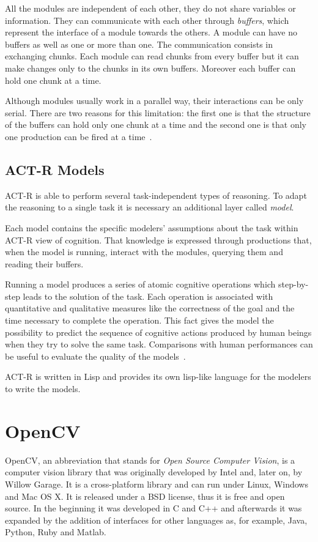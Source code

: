 	
		All the modules are independent of each other, they do not share variables or information. They can communicate with each other through \emph{buffers}, which represent the interface of a module towards the others. A module can have no buffers as well as one or more than one. The communication consists in exchanging chunks. Each module can read chunks from every buffer but it can make changes only to the chunks in its own buffers. Moreover each buffer can hold one chunk at a time. 

		Although modules usually work in a parallel way, their interactions can be only serial.
		There are two reasons for this limitation: the first one is that the structure of the buffers can hold only one chunk at a time and the second one is that only one production can be fired at a time~\cite{actr6refman}.
	
	\subsection{ACT-R Models}\label{modelSect}
	ACT-R is able to perform several task-independent types of reasoning. 
	To adapt the reasoning to a single task it is necessary an additional layer called \emph{model}.

	Each model contains the specific modelers' assumptions about the task within ACT-R view of cognition. That knowledge is expressed through productions that, when the model is running, interact with the modules, querying them and reading their buffers. 
	
	Running a model produces a series of atomic cognitive operations which step-by-step leads to the solution of the task. Each operation is associated with quantitative and qualitative measures like the correctness of the goal and the time necessary to complete the operation.
	This fact gives the model the possibility to predict the sequence of cognitive actions produced by human beings when they try to solve the same task.
	Comparisons with human performances can be useful to evaluate the quality of the models~\cite{Sears2012}.

	ACT-R is written in Lisp and provides its own lisp-like language for the modelers to write the models.



		

  \section{OpenCV}
	\mbox{OpenCV}, an abbreviation that stands for \emph{Open Source Computer Vision}, is a computer vision library that was originally developed by Intel and, later on, by Willow Garage.
	It is a cross-platform library and can run under Linux, Windows and Mac OS X. 
	It is released under a BSD license, thus it is free and open source. 
	In the beginning it was developed in C and C++ and afterwards it was expanded by the addition of interfaces for other languages as, for example, Java, Python, Ruby and Matlab. 

